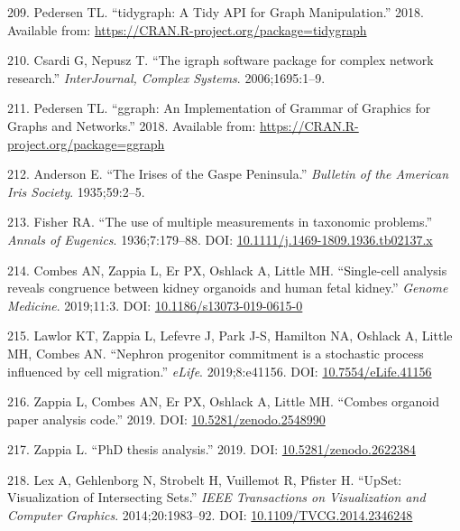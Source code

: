 \documentclass[11pt,a4paper,titlepage,twoside,openright]{style/unimelbthesis}
\theoremstyle{definition}
\theoremstyle{definition}
\theoremstyle{definition}
\theoremstyle{remark}
\begin{document}
\begin{mainmatter}
\leavevmode\hypertarget{ref-Pedersen2018-ly}{}%
209. Pedersen TL. ``tidygraph: A Tidy API for Graph Manipulation.'' 2018. Available from: \url{https://CRAN.R-project.org/package=tidygraph}

\leavevmode\hypertarget{ref-Csardi2006-ce}{}%
210. Csardi G, Nepusz T. ``The igraph software package for complex network research.'' \emph{InterJournal, Complex Systems}. 2006;1695:1--9.

\leavevmode\hypertarget{ref-Pedersen2018-ie}{}%
211. Pedersen TL. ``ggraph: An Implementation of Grammar of Graphics for Graphs and Networks.'' 2018. Available from: \url{https://CRAN.R-project.org/package=ggraph}

\leavevmode\hypertarget{ref-Anderson1935-mt}{}%
212. Anderson E. ``The Irises of the Gaspe Peninsula.'' \emph{Bulletin of the American Iris Society}. 1935;59:2--5.

\leavevmode\hypertarget{ref-Fisher1936-wt}{}%
213. Fisher RA. ``The use of multiple measurements in taxonomic problems.'' \emph{Annals of Eugenics}. 1936;7:179--88. DOI: \href{https://doi.org/10.1111/j.1469-1809.1936.tb02137.x}{10.1111/j.1469-1809.1936.tb02137.x}

\leavevmode\hypertarget{ref-Combes2019-uv}{}%
214. Combes AN, Zappia L, Er PX, Oshlack A, Little MH. ``Single-cell analysis reveals congruence between kidney organoids and human fetal kidney.'' \emph{Genome Medicine}. 2019;11:3. DOI: \href{https://doi.org/10.1186/s13073-019-0615-0}{10.1186/s13073-019-0615-0}

\leavevmode\hypertarget{ref-Lawlor2019-iw}{}%
215. Lawlor KT, Zappia L, Lefevre J, Park J-S, Hamilton NA, Oshlack A, Little MH, Combes AN. ``Nephron progenitor commitment is a stochastic process influenced by cell migration.'' \emph{eLife}. 2019;8:e41156. DOI: \href{https://doi.org/10.7554/eLife.41156}{10.7554/eLife.41156}

\leavevmode\hypertarget{ref-Zappia2019-dy}{}%
216. Zappia L, Combes AN, Er PX, Oshlack A, Little MH. ``Combes organoid paper analysis code.'' 2019. DOI: \href{https://doi.org/10.5281/zenodo.2548990}{10.5281/zenodo.2548990}

\leavevmode\hypertarget{ref-Zappia2019-kh}{}%
217. Zappia L. ``PhD thesis analysis.'' 2019. DOI: \href{https://doi.org/10.5281/zenodo.2622384}{10.5281/zenodo.2622384}

\leavevmode\hypertarget{ref-Lex2014-hy}{}%
218. Lex A, Gehlenborg N, Strobelt H, Vuillemot R, Pfister H. ``UpSet: Visualization of Intersecting Sets.'' \emph{IEEE Transactions on Visualization and Computer Graphics}. 2014;20:1983--92. DOI: \href{https://doi.org/10.1109/TVCG.2014.2346248}{10.1109/TVCG.2014.2346248}


\end{mainmatter}
\end{document}
